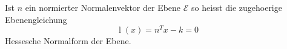 Ist $n$ ein normierter Normalenvektor der Ebene $\mathcal{E}$ so heisst die zugehoerige Ebenengleichung
$$\operatorname{l}(x) = n^T x - k = 0$$
Hessesche Normalform der Ebene.
